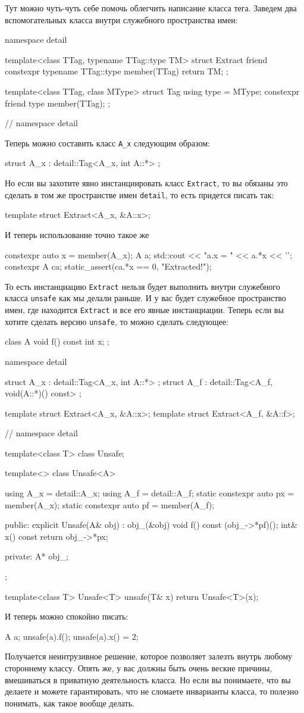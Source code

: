 Тут можно чуть-чуть себе помочь облегчить написание класса тега.
Заведем два вспомогательных класса внутри служебного пространства имен:
\begin{cppcode}
namespace detail {
template<class TTag, typename TTag::type TM>
struct Extract {
  friend constexpr typename TTag::type member(TTag) {
    return TM;
  }
};

template<class TTag, class MType>
struct Tag {
  using type = MType;
  constexpr friend type member(TTag);
};
} // namespace detail
\end{cppcode}
Теперь можно составить класс \verb"A_x" следующим образом:
\begin{cppcode}
struct A_x : detail::Tag<A_x, int A::*> {};
\end{cppcode}
Но если вы захотите явно инстанциировать класс \verb"Extract", то вы обязаны это сделать в том же пространстве имен \verb"detail", то есть придется писать так:
\begin{cppcode}
template struct Extract<A_x, &A::x>;
\end{cppcode}
И теперь использование точно такое же
\begin{cppcode}
constexpr auto x = member(A_x{});
A a;
std::cout << "a.x = " << a.*x << '\n';
constexpr A ca;
static_assert(ca.*x == 0, "Extracted!");
\end{cppcode}
То есть инстанциацию \verb"Extract" нельзя будет выполнить внутри служебного класса \verb"unsafe" как мы делали раньше.
И у вас будет служебное пространство имен, где находится \verb"Extract" и все его явные инстанциации.
Теперь если вы хотите сделать версию \verb"unsafe", то можно сделать следующее:
\begin{cppcode}
class A {
  void f() const {}
  int x;
};

namespace detail {
struct A_x : detail::Tag<A_x, int A::*> {};
struct A_f : detail::Tag<A_f, void(A::*)() const> {};

template struct Extract<A_x, &A::x>;
template struct Extract<A_f, &A::f>;
} // namespace detail

template<class T>
class Unsafe;

template<>
class Unsafe<A> {
  using A_x = detail::A_x;
  using A_f = detail::A_f;
  static constexpr auto px = member(A_x{});
  static constexpr auto pf = member(A_f{});

public:
  explicit Unsafe(A& obj) : obj_(&obj) {
  }
  void f() const {
    (obj_->*pf)();
  }
  int& x() const {
    return obj_->*px;
  }

private:
  A* obj_;
};

template<class T>
Unsafe<T> unsafe(T& x) {
  return Unsafe<T>(x);
}
\end{cppcode}
И теперь можно спокойно писать:
\begin{cppcode}
A a;
unsafe(a).f();
unsafe(a).x() = 2;
\end{cppcode}
Получается неинтрузивное решение, которое позволяет залезть внутрь любому стороннему классу.
Опять же, у вас должны быть очень веские причины, вмешиваться в приватную деятельность класса.
Но если вы понимаете, что вы делаете и можете гарантировать, что не сломаете инварианты класса, то полезно понимать, как такое вообще делать.

